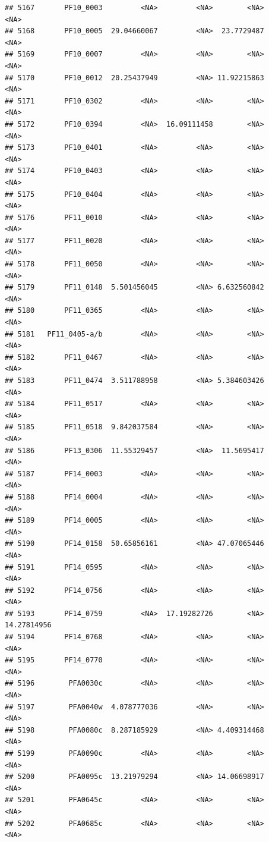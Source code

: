 \documentclass[12pt, a4paper]{article}\usepackage[]{graphicx}\usepackage[]{color}
\makeatletter
\newenvironment{kframe}{%
 \def\at@end@of@kframe{}%
 \ifinner\ifhmode%
  \def\at@end@of@kframe{\end{minipage}}%
  \begin{minipage}{\columnwidth}%
 \fi\fi%
 \def\FrameCommand##1{\hskip\@totalleftmargin \hskip-\fboxsep
 \colorbox{shadecolor}{##1}\hskip-\fboxsep
     \hskip-\linewidth \hskip-\@totalleftmargin \hskip\columnwidth}%
 \MakeFramed {\advance\hsize-\width
   \@totalleftmargin\z@ \linewidth\hsize
   \@setminipage}}%
 {\par\unskip\endMakeFramed%
 \at@end@of@kframe}
\newenvironment{knitrout}{}{} %
\makeatother
\begin{document}
\begin{knitrout}
\begin{kframe}
\begin{verbatim}
## 5167       PF10_0003         <NA>         <NA>        <NA>        <NA>
## 5168       PF10_0005  29.04660067         <NA>  23.7729487        <NA>
## 5169       PF10_0007         <NA>         <NA>        <NA>        <NA>
## 5170       PF10_0012  20.25437949         <NA> 11.92215863        <NA>
## 5171       PF10_0302         <NA>         <NA>        <NA>        <NA>
## 5172       PF10_0394         <NA>  16.09111458        <NA>        <NA>
## 5173       PF10_0401         <NA>         <NA>        <NA>        <NA>
## 5174       PF10_0403         <NA>         <NA>        <NA>        <NA>
## 5175       PF10_0404         <NA>         <NA>        <NA>        <NA>
## 5176       PF11_0010         <NA>         <NA>        <NA>        <NA>
## 5177       PF11_0020         <NA>         <NA>        <NA>        <NA>
## 5178       PF11_0050         <NA>         <NA>        <NA>        <NA>
## 5179       PF11_0148  5.501456045         <NA> 6.632560842        <NA>
## 5180       PF11_0365         <NA>         <NA>        <NA>        <NA>
## 5181   PF11_0405-a/b         <NA>         <NA>        <NA>        <NA>
## 5182       PF11_0467         <NA>         <NA>        <NA>        <NA>
## 5183       PF11_0474  3.511788958         <NA> 5.384603426        <NA>
## 5184       PF11_0517         <NA>         <NA>        <NA>        <NA>
## 5185       PF11_0518  9.842037584         <NA>        <NA>        <NA>
## 5186       PF13_0306  11.55329457         <NA>  11.5695417        <NA>
## 5187       PF14_0003         <NA>         <NA>        <NA>        <NA>
## 5188       PF14_0004         <NA>         <NA>        <NA>        <NA>
## 5189       PF14_0005         <NA>         <NA>        <NA>        <NA>
## 5190       PF14_0158  50.65856161         <NA> 47.07065446        <NA>
## 5191       PF14_0595         <NA>         <NA>        <NA>        <NA>
## 5192       PF14_0756         <NA>         <NA>        <NA>        <NA>
## 5193       PF14_0759         <NA>  17.19282726        <NA> 14.27814956
## 5194       PF14_0768         <NA>         <NA>        <NA>        <NA>
## 5195       PF14_0770         <NA>         <NA>        <NA>        <NA>
## 5196        PFA0030c         <NA>         <NA>        <NA>        <NA>
## 5197        PFA0040w  4.078777036         <NA>        <NA>        <NA>
## 5198        PFA0080c  8.287185929         <NA> 4.409314468        <NA>
## 5199        PFA0090c         <NA>         <NA>        <NA>        <NA>
## 5200        PFA0095c  13.21979294         <NA> 14.06698917        <NA>
## 5201        PFA0645c         <NA>         <NA>        <NA>        <NA>
## 5202        PFA0685c         <NA>         <NA>        <NA>        <NA>

\end{verbatim}
\end{kframe}
\end{knitrout}
\end{document}
